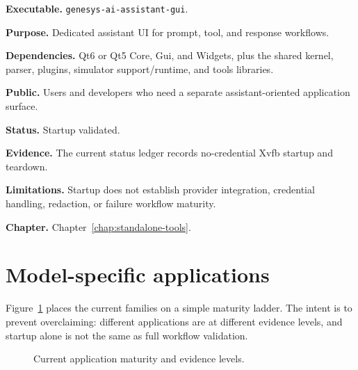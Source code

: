 \noindent\textbf{Executable.} \texttt{genesys-ai-assistant-gui}.

\noindent\textbf{Purpose.} Dedicated assistant UI for prompt, tool, and response workflows.

\noindent\textbf{Dependencies.} Qt6 or Qt5 Core, Gui, and Widgets, plus the shared kernel, parser, plugins, simulator support/runtime, and tools libraries.

\noindent\textbf{Public.} Users and developers who need a separate assistant-oriented application surface.

\noindent\textbf{Status.} Startup validated.

\noindent\textbf{Evidence.} The current status ledger records no-credential Xvfb startup and teardown.

\noindent\textbf{Limitations.} Startup does not establish provider integration, credential handling, redaction, or failure workflow maturity.

\noindent\textbf{Chapter.} Chapter~\ref{chap:standalone-tools}.

\section{Model-specific applications}
\label{sec:application-overview-model-specific}

Figure~\ref{fig:application-maturity-map} places the current families on a
simple maturity ladder. The intent is to prevent overclaiming: different
applications are at different evidence levels, and startup alone is not the
same as full workflow validation.

\begin{figure}[htbp]
\centering
{}
\caption{Current application maturity and evidence levels.}
\label{fig:application-maturity-map}
\end{figure}

